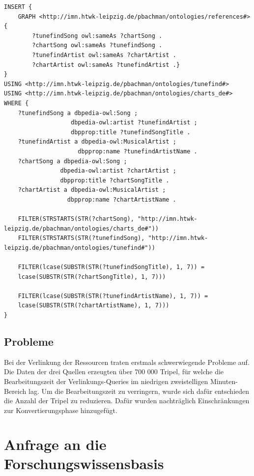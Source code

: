 \documentclass[parskip]{scrartcl}
\begin{document}
\begin{lstlisting}[caption={SPARQL-Query zur Referenzierung von Tunefind und Charts}, label={lst:refTunefindCharts}]
INSERT {
    GRAPH <http://imn.htwk-leipzig.de/pbachman/ontologies/references#> { 
        ?tunefindSong owl:sameAs ?chartSong .
        ?chartSong owl:sameAs ?tunefindSong .        
        ?tunefindArtist owl:sameAs ?chartArtist .
        ?chartArtist owl:sameAs ?tunefindArtist .}
}
USING <http://imn.htwk-leipzig.de/pbachman/ontologies/tunefind#>
USING <http://imn.htwk-leipzig.de/pbachman/ontologies/charts_de#>
WHERE {
    ?tunefindSong a dbpedia-owl:Song ;
                   dbpedia-owl:artist ?tunefindArtist ;
                   dbpprop:title ?tunefindSongTitle .
    ?tunefindArtist a dbpedia-owl:MusicalArtist ;
                     dbpprop:name ?tunefindArtistName .
    ?chartSong a dbpedia-owl:Song ;
                dbpedia-owl:artist ?chartArtist ;
                dbpprop:title ?chartSongTitle .
    ?chartArtist a dbpedia-owl:MusicalArtist ;
                  dbpprop:name ?chartArtistName .
    
    FILTER(STRSTARTS(STR(?chartSong), "http://imn.htwk-leipzig.de/pbachman/ontologies/charts_de#"))
    FILTER(STRSTARTS(STR(?tunefindSong), "http://imn.htwk-leipzig.de/pbachman/ontologies/tunefind#"))
    
    FILTER(lcase(SUBSTR(STR(?tunefindSongTitle), 1, 7)) =
    lcase(SUBSTR(STR(?chartSongTitle), 1, 7)))
    
    FILTER(lcase(SUBSTR(STR(?tunefindArtistName), 1, 7)) =
    lcase(SUBSTR(STR(?chartArtistName), 1, 7)))
}
\end{lstlisting}

\subsection{Probleme}
\label{subsec:problems}

Bei der Verlinkung der Ressourcen traten erstmals schwerwiegende Probleme auf. Die Daten der drei Quellen erzeugten über 700 000 Tripel, für welche die Bearbeitungszeit der Verlinkungs-Queries im niedrigen zweistelligen  Minuten-Bereich lag. Um die Bearbeitungszeit zu verringern, wurde sich dafür entschieden die Anzahl der Tripel zu reduzieren. Dafür wurden nachträglich Einschränkungen zur Konvertierungsphase hinzugefügt.

\section{Anfrage an die Forschungswissensbasis}
\end{document}
